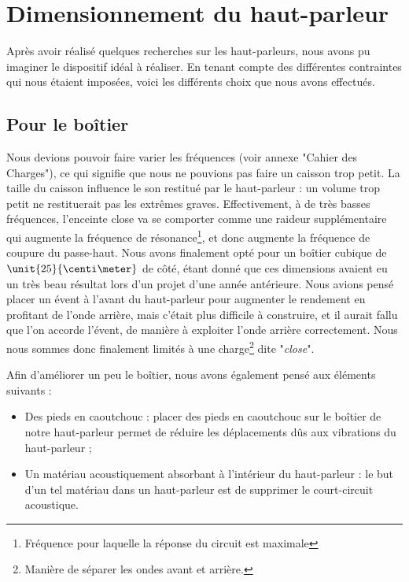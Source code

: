

\section{Dimensionnement du haut-parleur}
Après avoir réalisé quelques recherches sur les haut-parleurs, nous avons pu imaginer le dispositif idéal 
à réaliser. En tenant compte des différentes contraintes qui nous étaient imposées, voici les différents 
choix que nous avons effectués.

\subsection{Pour le boîtier}
Nous devions pouvoir faire varier les fréquences (voir annexe "Cahier des Charges"), ce qui signifie que nous ne 
pouvions pas faire un caisson trop petit. La taille du caisson influence le son restitué par le haut-parleur :
un volume trop petit ne restituerait pas les extrêmes graves. Effectivement, à de très basses 
fréquences, l'enceinte close va se comporter comme une raideur supplémentaire qui augmente la fréquence de
résonance\footnote{Fréquence pour laquelle la réponse du circuit est maximale}, et donc augmente la 
fréquence de coupure du passe-haut\cite{volume}. Nous avons finalement opté pour un boîtier cubique de 
$\unit{25}{\centi\meter}$ de côté, étant donné que ces dimensions avaient eu un très beau résultat lors 
d'un projet d'une année antérieure. Nous avions pensé placer un évent à l'avant du haut-parleur 
pour augmenter le rendement en profitant de l'onde arrière, mais c'était plus difficile à construire, et 
il aurait fallu que l'on accorde l'évent, de manière à exploiter l'onde arrière correctement. Nous nous 
sommes donc finalement limités à une charge\footnote{Manière de séparer les ondes avant et arrière.} dite "\textit{close}"\cite{close}.  

Afin d'améliorer un peu le boîtier, nous avons également pensé aux éléments suivants :

\begin{itemize}
	\item	Des pieds en caoutchouc : placer des pieds en caoutchouc sur le boîtier de notre haut-parleur
				permet de réduire les déplacements dûs aux vibrations du haut-parleur ;
	\item	Un matériau acoustiquement absorbant à l'intérieur du haut-parleur : le but d'un tel matériau
				dans un haut-parleur est de supprimer le court-circuit acoustique\cite{absorber}.
\end{itemize}

